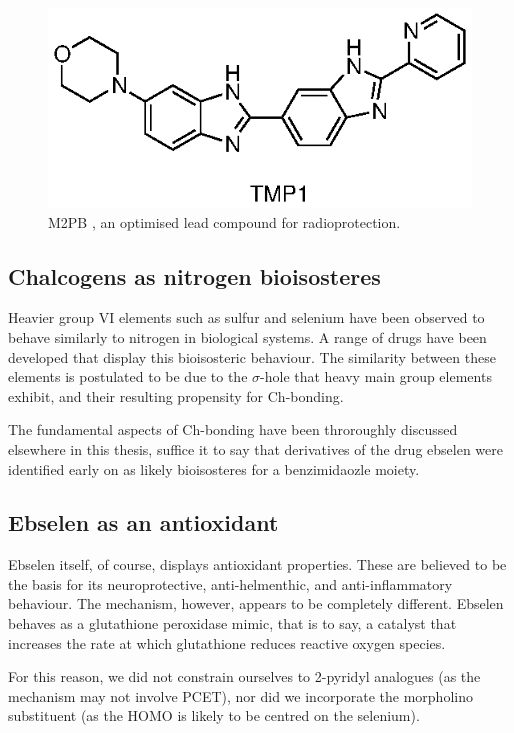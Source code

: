 \begin{refsection}
\begin{figure}
\includegraphics[scale=0.74]{Figures/m2pb.eps}
\caption{M2PB , an optimised lead compound for radioprotection.}
\label{fig:m2pb}
\end{figure}


\subsection{Chalcogens as nitrogen bioisosteres}
Heavier group VI elements such as sulfur and selenium have been observed to behave similarly to nitrogen in biological systems.
A range of drugs have been developed that display this bioisosteric behaviour\autocite{Beno2015}.
The similarity between these elements is postulated to be due to the $\sigma$-hole that heavy main group elements exhibit, and their resulting propensity for Ch-bonding.

The fundamental aspects of Ch-bonding have been throroughly discussed elsewhere in this thesis, suffice it to say that derivatives of the drug ebselen  were identified early on as likely bioisosteres for a benzimidaozle moiety.


\subsection{Ebselen as an antioxidant}
Ebselen itself, of course, displays antioxidant properties.
These are believed to be the basis for its neuroprotective, anti-helmenthic, and anti-inflammatory behaviour.
The mechanism, however, appears to be completely different.
Ebselen behaves as a glutathione peroxidase mimic, that is to say, a catalyst that increases the rate at which glutathione reduces reactive oxygen species.

\label{sec:simplification}
For this reason, we did not constrain ourselves to 2-pyridyl analogues (as the mechanism may not involve PCET), nor did we incorporate the morpholino substituent (as the HOMO is likely to be centred on the selenium).


\end{refsection}

